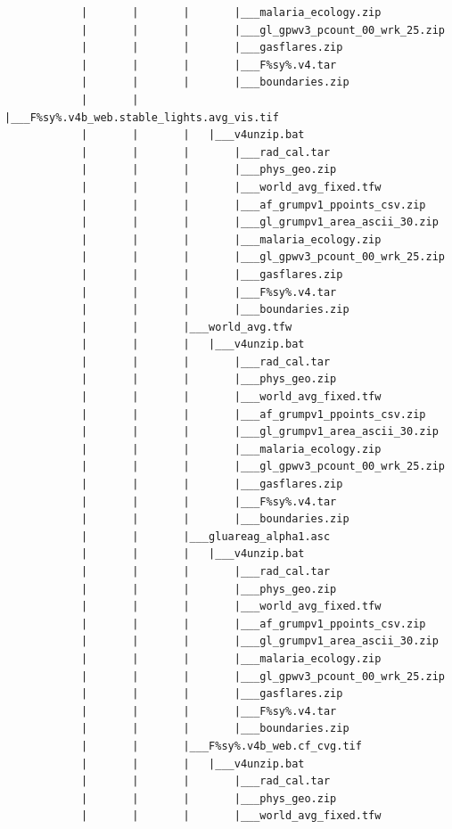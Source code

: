 \documentclass[]{book}
\begin{document}
\begin{verbatim}
            |       |       |       |___malaria_ecology.zip
            |       |       |       |___gl_gpwv3_pcount_00_wrk_25.zip
            |       |       |       |___gasflares.zip
            |       |       |       |___F%sy%.v4.tar
            |       |       |       |___boundaries.zip
            |       |       |___F%sy%.v4b_web.stable_lights.avg_vis.tif
            |       |       |   |___v4unzip.bat
            |       |       |       |___rad_cal.tar
            |       |       |       |___phys_geo.zip
            |       |       |       |___world_avg_fixed.tfw
            |       |       |       |___af_grumpv1_ppoints_csv.zip
            |       |       |       |___gl_grumpv1_area_ascii_30.zip
            |       |       |       |___malaria_ecology.zip
            |       |       |       |___gl_gpwv3_pcount_00_wrk_25.zip
            |       |       |       |___gasflares.zip
            |       |       |       |___F%sy%.v4.tar
            |       |       |       |___boundaries.zip
            |       |       |___world_avg.tfw
            |       |       |   |___v4unzip.bat
            |       |       |       |___rad_cal.tar
            |       |       |       |___phys_geo.zip
            |       |       |       |___world_avg_fixed.tfw
            |       |       |       |___af_grumpv1_ppoints_csv.zip
            |       |       |       |___gl_grumpv1_area_ascii_30.zip
            |       |       |       |___malaria_ecology.zip
            |       |       |       |___gl_gpwv3_pcount_00_wrk_25.zip
            |       |       |       |___gasflares.zip
            |       |       |       |___F%sy%.v4.tar
            |       |       |       |___boundaries.zip
            |       |       |___gluareag_alpha1.asc
            |       |       |   |___v4unzip.bat
            |       |       |       |___rad_cal.tar
            |       |       |       |___phys_geo.zip
            |       |       |       |___world_avg_fixed.tfw
            |       |       |       |___af_grumpv1_ppoints_csv.zip
            |       |       |       |___gl_grumpv1_area_ascii_30.zip
            |       |       |       |___malaria_ecology.zip
            |       |       |       |___gl_gpwv3_pcount_00_wrk_25.zip
            |       |       |       |___gasflares.zip
            |       |       |       |___F%sy%.v4.tar
            |       |       |       |___boundaries.zip
            |       |       |___F%sy%.v4b_web.cf_cvg.tif
            |       |       |   |___v4unzip.bat
            |       |       |       |___rad_cal.tar
            |       |       |       |___phys_geo.zip
            |       |       |       |___world_avg_fixed.tfw

\end{verbatim}
\end{document}
